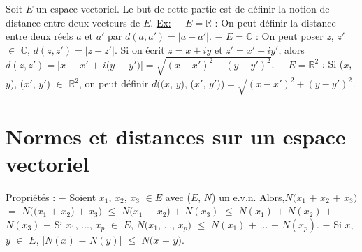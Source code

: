 \documentclass{article}
\begin{document}
\newcommand{\Boulecinq}{
\begin{tikzpicture}[scale=0.65]
    \draw [->] (0,-1.5) -- (0,1.5);
    \draw [->] (-1.5,0) -- (1.5,0);
    \draw (0,1.65) node{\tiny{$x_2$}};
    \draw (1.8,0) node{\tiny{$x_1$}};
    \draw (0.2,1.2) node{\tiny{$1$}};
    \draw (1.2,0.2) node{\tiny{$1$}};
    \draw (-1.3,0.2) node{\tiny{$-1$}};
    \draw (0.3,-1.2) node{\tiny{$-1$}};
    \draw [dashed, color=gray!80, pattern=north west lines, pattern color=blue] (-1,0) -- (0,1) -- (1,0) -- (0,-1) -- cycle;
\end{tikzpicture}
}
\maketitle
\bigbreak

\parindent=0cm 
Soit $E$ un espace vectoriel.
\smallbreak
Le but de cette partie est de définir la notion de distance entre deux vecteurs de $E$.
\smallbreak
\underline{Ex:} $-$ $E = \mathbb{R}$ :
On peut définir la distance entre deux réels $a$ et $a'$ par $d(a,a') = |a - a'|$.
\smallbreak
\hspace*{0.72cm}$-$ $E = \mathbb{C}$ : On peut poser $z$, $z'$ $\in$ $\mathbb{C}$, $d(z,z') = |z - z'|$. Si on écrit $z = x + iy$ et $z' = x' + iy'$, alors \smallbreak $d(z,z') = |x$ $-$ $x'$ $+$ $i(y$ $-$ $y')| = \sqrt{(x - x')^2 + (y - y')^2}$.
\smallbreak
\hspace*{0.72cm}$-$ $E = \mathbb{R}^2$ : Si ($x$, $y$), ($x'$, $y'$) $\in$ $\mathbb{R}^2$, on peut définir $d((x$, $y$), ($x'$, $y'$))$ = \sqrt{(x - x')^2 + (y - y')^2}$.
\medbreak
\section{Normes et distances sur un espace vectoriel}
\medbreak
{}
\smallbreak
{}
\smallbreak
\underline{Propriétés :}
\parindent=1cm  
\smallbreak
$-$ Soient $x_1$, $x_2$, $x_3$ $\in E$ avec ($E$, $N$) un e.v.n. Alors,\smallbreak $N(x_1$ $+$ $x_2$ $+$ $x_3)$ $=$ $N((x_1$ $+$ $x_2$) $+$ $x_3)$ $\leqslant$ $N(x_1$ $+$ $x_2$) $+$ $N(x_3)$ $\leqslant$ $N(x_1)$ $+$ $ N(x_2)$ $+$ $N(x_3)$
\smallbreak
$-$ Si $x_1$, ..., $x_p$ $\in$ $E$, $N(x_1$, ..., $x_p)$ $\leqslant$ $N(x_1)$ $+$ ... $+$ $N(x_p)$.
\smallbreak
$-$ Si $x$, $y$ $\in$ $E$, |$N(x)$ $-$ $N(y)$| $\leqslant$ $N(x$ $-$ $y)$.
\end{document}
